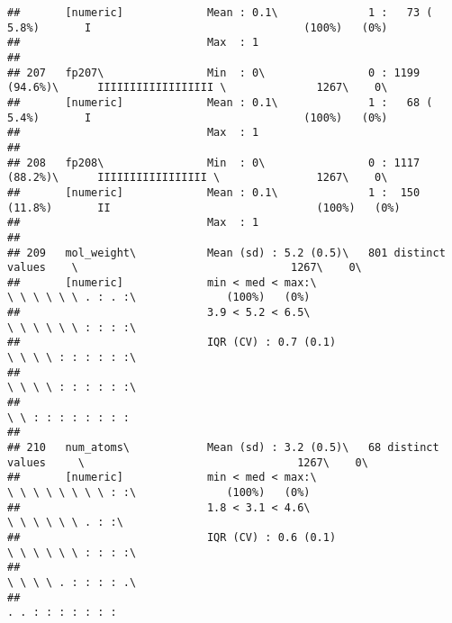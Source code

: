 \documentclass[]{article}
\begin{document}
\begin{verbatim}
##       [numeric]             Mean : 0.1\              1 :   73 ( 5.8%)       I                                 (100%)   (0%)     
##                             Max  : 1                                                                                            
## 
## 207   fp207\                Min  : 0\                0 : 1199 (94.6%)\      IIIIIIIIIIIIIIIIII \              1267\    0\       
##       [numeric]             Mean : 0.1\              1 :   68 ( 5.4%)       I                                 (100%)   (0%)     
##                             Max  : 1                                                                                            
## 
## 208   fp208\                Min  : 0\                0 : 1117 (88.2%)\      IIIIIIIIIIIIIIIII \               1267\    0\       
##       [numeric]             Mean : 0.1\              1 :  150 (11.8%)       II                                (100%)   (0%)     
##                             Max  : 1                                                                                            
## 
## 209   mol_weight\           Mean (sd) : 5.2 (0.5)\   801 distinct values    \                                 1267\    0\       
##       [numeric]             min < med < max:\                               \ \ \ \ \ \ . : . :\              (100%)   (0%)     
##                             3.9 < 5.2 < 6.5\                                \ \ \ \ \ \ : : : :\                                
##                             IQR (CV) : 0.7 (0.1)                            \ \ \ \ : : : : : :\                                
##                                                                             \ \ \ \ : : : : : :\                                
##                                                                             \ \ : : : : : : : :                                 
## 
## 210   num_atoms\            Mean (sd) : 3.2 (0.5)\   68 distinct values     \                                 1267\    0\       
##       [numeric]             min < med < max:\                               \ \ \ \ \ \ \ \ : :\              (100%)   (0%)     
##                             1.8 < 3.1 < 4.6\                                \ \ \ \ \ \ . : :\                                  
##                             IQR (CV) : 0.6 (0.1)                            \ \ \ \ \ \ : : : :\                                
##                                                                             \ \ \ \ . : : : : .\                                
##                                                                             . . : : : : : : :                                   

\end{verbatim}
\end{document}
